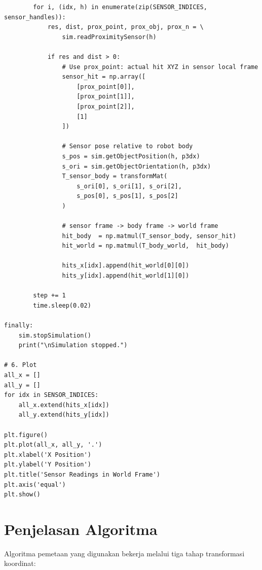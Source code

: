 \documentclass{article}
\begin{document}
\begin{verbatim}
        for i, (idx, h) in enumerate(zip(SENSOR_INDICES, sensor_handles)):
            res, dist, prox_point, prox_obj, prox_n = \
                sim.readProximitySensor(h)

            if res and dist > 0:
                # Use prox_point: actual hit XYZ in sensor local frame
                sensor_hit = np.array([
                    [prox_point[0]],
                    [prox_point[1]],
                    [prox_point[2]],
                    [1]
                ])

                # Sensor pose relative to robot body
                s_pos = sim.getObjectPosition(h, p3dx)
                s_ori = sim.getObjectOrientation(h, p3dx)
                T_sensor_body = transformMat(
                    s_ori[0], s_ori[1], s_ori[2],
                    s_pos[0], s_pos[1], s_pos[2]
                )

                # sensor frame -> body frame -> world frame
                hit_body  = np.matmul(T_sensor_body, sensor_hit)
                hit_world = np.matmul(T_body_world,  hit_body)

                hits_x[idx].append(hit_world[0][0])
                hits_y[idx].append(hit_world[1][0])

        step += 1
        time.sleep(0.02)

finally:
    sim.stopSimulation()
    print("\nSimulation stopped.")

# 6. Plot
all_x = []
all_y = []
for idx in SENSOR_INDICES:
    all_x.extend(hits_x[idx])
    all_y.extend(hits_y[idx])

plt.figure()
plt.plot(all_x, all_y, '.')
plt.xlabel('X Position')
plt.ylabel('Y Position')
plt.title('Sensor Readings in World Frame')
plt.axis('equal')
plt.show()
\end{verbatim}

\section*{Penjelasan Algoritma}

Algoritma pemetaan yang digunakan bekerja melalui tiga tahap transformasi koordinat:
\end{document}
